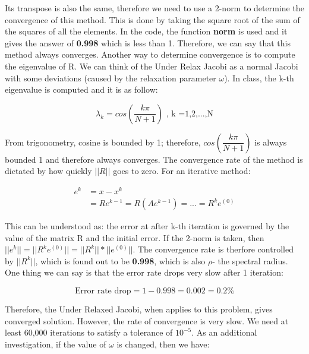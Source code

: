 \documentclass{article}
\begin{document}
\noindent
Its transpose is also the same, therefore we need to use a 2-norm to determine the convergence of this method. This is done by taking the square root of the sum of the squares of all the elements. In the code, the function \textbf{norm} is used and it gives the answer of \textbf{0.998} which is less than 1. Therefore, we can say that this method always converges. Another way to determine convergence is to compute the eigenvalue of R. We can think of the Under Relax Jacobi as a normal Jacobi with some deviations (caused by the relaxation parameter $\omega$). In class, the k-th eigenvalue is computed and it is as follow: 

\begin{equation}
	\lambda_k = cos\left(\dfrac{k\pi}{N+1}\right) \textrm{ , k =1,2,...,N}
\end{equation}

\noindent
From trigonometry, cosine is bounded by 1; therefore, $cos\left(\dfrac{k\pi}{N+1}\right)$ is always bounded 1 and therefore always converges.
The convergence rate of the method is dictated by how quickly $||R||$ goes to zero. For an iterative method: 

\begin{align*}
	e^k &= x - x^k\\
	 &= Re^{k-1} = R(Ae^{k-1}) = ... = R^ke^{(0)}
\end{align*} 
 
\noindent
This can be understood as: the error at after k-th iteration is governed by the value of the matrix R and the initial error.  If the 2-norm is taken, then $||e^k|| = ||R^ke^{(0)}|| = ||R^k||*||e^{(0)}||$. The convergence rate is therfore controlled by $||R^k||$, which is found out to be \textbf{0.998}, which is also $\rho$- the spectral radius. One thing we can say is that the error rate drops very slow after 1 iteration: 

\begin{equation*}
	\textrm{Error rate drop} = 1- 0.998 = 0.002 = 0.2\%
\end{equation*}

\noindent
Therefore, the Under Relaxed Jacobi, when applies to this problem, gives converged solution.  However, the rate of convergence is very slow. We need at least 60,000 iterations to satisfy a tolerance of $10^{-5}$. As an additional investigation, if the value of $\omega$ is changed, then we have: 
\end{document}
